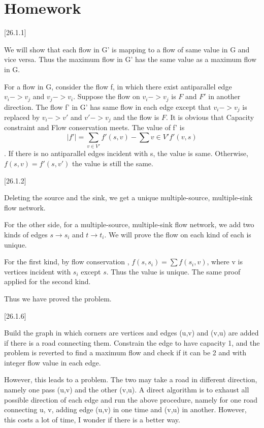 \documentclass[language=english]{njurepo}
\begin{document}
\part{Homework}

 [26.1.1]
 
  
    We will show that each flow in G' is mapping to a flow of same value in G and vice versa. Thus the maximum flow in G' has the same value as a maximum flow in G.

    For a flow in G, consider the flow f, in which there exist antiparallel edge $v_i->v_j$ and $v_j->v_i$. Suppose the flow on $v_i->v_j$ is $F$ and $F'$ in another direction. The flow f' in G' has same flow in each edge except that $v_i->v_j$ is replaced by $v_i->v'$ and $v'->v_j$ and the flow is $F$. It is obvious that Capacity constraint and Flow conservation meets. The value of f' is $$|f'|=\sum_{v\in V'}f'(s,v)-\sum{v\in V'}f'(v,s)$$. If there is no antiparallel edges incident with s, the value is same. Otherwise, $f(s,v)=f'(s,v')$ the value is still the same.

    
  

 [26.1.2]
 
  
    Deleting the source and the sink, we get a unique multiple-source, multiple-sink flow network.

    For the other side, for a multiple-source, multiple-sink flow network, we add two kinds of edges $s\rightarrow s_i$ and $t\rightarrow t_i$. We will prove the flow on each kind of each is unique.
    
    For the first kind, by flow conservation , $f(s, s_i)=\sum f(s_i, v)$, where v is vertices incident with $s_i$ except $s$. Thus the value is unique. The same proof applied for the second kind.

    Thus we have proved the problem.
  

 [26.1.6]
 
  
    Build the graph in which corners are vertices and edges (u,v) and (v,u) are added if there is a road connecting them. Constrain the edge to have capacity 1, and the problem is reverted to find a maximum flow and check if it can be 2 and with integer flow value in each edge.

    However, this leads to a problem. The two may take a road in different direction, namely one pass (u,v) and the other (v,u). A direct algorithm is to exhaust all possible direction of each edge and run the above procedure, namely for one road connecting u, v, adding edge (u,v) in one time and (v,u) in another. However, this costs a lot of time, I wonder if there is a better way.
  
\end{document}
